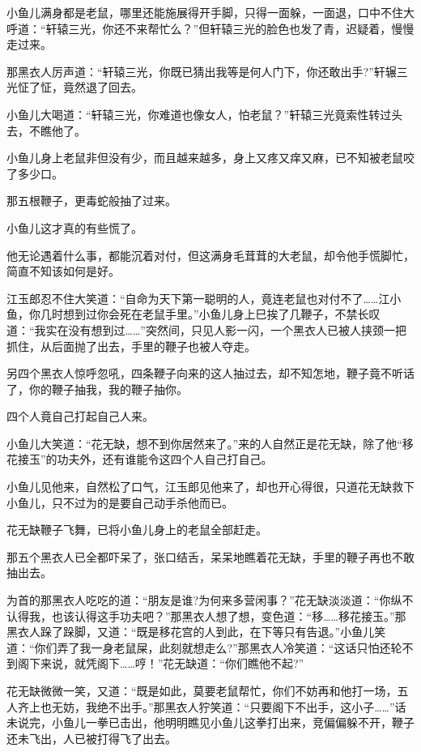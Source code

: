 \documentclass[12pt,oneside]{book}
\begin{document}
小鱼儿满身都是老鼠，哪里还能施展得开手脚，只得一面躲，一面退，口中不住大呼道：``轩辕三光，你还不来帮忙么？''但轩辕三光的脸色也发了青，迟疑着，慢慢走过来。

那黑衣人厉声道：``轩辕三光，你既已猜出我等是何人门下，你还敢出手?''轩辗三光怔了怔，竟然退了回去。

小鱼儿大喝道：``轩辕三光，你难道也像女人，怕老鼠？''轩辕三光竟索性转过头去，不瞧他了。

小鱼儿身上老鼠非但没有少，而且越来越多，身上又疼又痒又麻，已不知被老鼠咬了多少口。

那五根鞭子，更毒蛇般抽了过来。

小鱼儿这才真的有些慌了。

他无论遇着什么事，都能沉着对付，但这满身毛茸茸的大老鼠，却令他手慌脚忙，简直不知该如何是好。

江玉郎忍不住大笑道：``自命为天下第一聪明的人，竟连老鼠也对付不了\ldots\ldots 江小鱼，你几时想到过你会死在老鼠手里。''小鱼儿身上巳挨了几鞭子，不禁长叹道：``我实在没有想到过\ldots\ldots{}''突然间，只见人影一闪，一个黑衣人已被人挟颈一把抓住，从后面抛了出去，手里的鞭子也被人夺走。

另四个黑衣人惊呼忽吼，四条鞭子向来的这人抽过去，却不知怎地，鞭子竟不听话了，你的鞭子抽我，我的鞭子抽你。

四个人竟自己打起自己人来。

小鱼儿大笑道：``花无缺，想不到你居然来了。''来的人自然正是花无缺，除了他``移花接玉''的功夫外，还有谁能令这四个人自己打自己。

小鱼儿见他来，自然松了口气，江玉郎见他来了，却也开心得很，只道花无缺救下小鱼儿，只不过为的是要自己动手杀他而已。

花无缺鞭子飞舞，已将小鱼儿身上的老鼠全部赶走。

那五个黑衣人已全都吓呆了，张口结舌，呆呆地瞧着花无缺，手里的鞭子再也不敢抽出去。

为首的那黑衣人吃吃的道：``朋友是谁?为何来多营闲事？''花无缺淡淡道：``你纵不认得我，也该认得这手功夫吧？''那黑衣人想了想，变色道：``移\ldots\ldots 移花接玉。''那黑衣人跺了跺脚，又道：``既是移花宫的人到此，在下等只有告退。''小鱼儿笑道：``你们弄了我一身老鼠屎，此刻就想走么?''那黑衣人冷笑道：``这话只怕还轮不到阁下来说，就凭阁下\ldots\ldots 哼！''花无缺道：``你们瞧他不起?''

花无缺微微一笑，又道：``既是如此，莫要老鼠帮忙，你们不妨再和他打一场，五人齐上也无妨，我绝不出手。''那黑衣人狞笑道：``只要阁下不出手，这小子\ldots\ldots{}''话未说完，小鱼儿一拳已击出，他明明瞧见小鱼儿这拳打出来，竞偏偏躲不开，鞭子还未飞出，人已被打得飞了出去。
\end{document}
